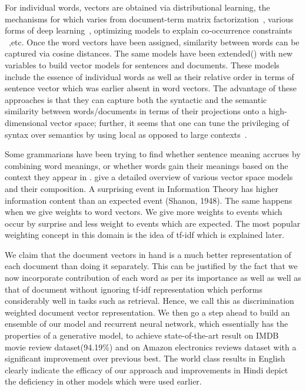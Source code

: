\documentclass[11pt,a4paper]{article}
\begin{document}
For individual words, vectors are obtained via distributional learning, the mechanisms for which varies from document-term matrix factorization~\cite{Landauer:97}, various forms of deep learning~\cite{Collobert:08,Turian:10,Socher:13}, optimizing models to explain co-occurrence constraints ~\cite{Mikolov:13a,Pennington:14},etc. Once the word vectors have been assigned, similarity between words can be captured via cosine distances. The same models have been extended(\cite{Le:14}) with new variables to build vector models for sentences and documents. These models include the essence of individual words as well as their relative order in terms of sentence vector which was earlier absent in word vectors. The advantage of these approaches is that they can capture both the syntactic and the semantic similarity between words/documents in terms of their projections onto a high-dimensional vector space; further, it seems that one can tune the privileging of syntax over semantics by using local as opposed to large contexts~\cite{Huang:12}.

Some grammarians have been trying to find whether sentence meaning accrues by combining word meanings, or whether words gain their meanings based on the context they appear in \cite{Matilal:90}. 
\cite{Turney:10} give a detailed overview of various vector space models and their composition. A surprising event in Information Theory has higher information content than an expected event (Shanon, 1948). The same happens when we give weights to word vectors. We give more weights to events which occur by surprise and less weight to events which are expected. The most popular weighting concept in this domain is the idea of tf-idf which is explained later.

We claim that the document vectors in hand is a much better representation of each document than doing it separately. This can be justified by the fact that we now incorporate contribution of each
word as per its importance as well as well as that of document without ignoring tf-idf representation which performs considerably well in tasks such as retrieval. Hence, we call this as discrimination weighted document vector representation. We then go a step ahead to build an ensemble of our model and recurrent neural network, which essentially has the properties of a generative model, to achieve state-of-the-art result on IMDB movie review dataset(94.19\%) and on Amazon electronics reviews dataset with a significant improvement over previous best.
The world class results in English clearly indicate the efficacy of our approach and improvements in Hindi depict the deficiency in other models which were used earlier.
\end{document}
